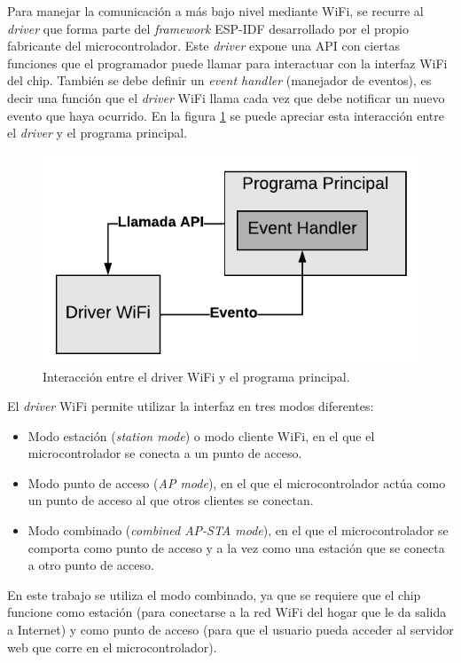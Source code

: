 Para manejar la comunicación a más bajo nivel mediante WiFi, se recurre al \emph{driver} que forma parte del \emph{framework} ESP-IDF desarrollado por el propio fabricante del microcontrolador. Este \emph{driver} expone una API con ciertas funciones que el programador puede llamar para interactuar con la interfaz WiFi del chip. También se debe definir un \emph{event handler} (manejador de eventos), es decir una función que el \emph{driver} WiFi llama cada vez que debe notificar un nuevo evento que haya ocurrido. En la figura \ref{fig:wifi_driver} se puede apreciar esta interacción entre el \emph{driver} y el programa principal.

\begin{figure}[h]
\centering
\includegraphics[scale=1.0]{./Figures/wifi_driver.pdf}
\caption{Interacción entre el driver WiFi y el programa principal.}
\label{fig:wifi_driver}
\end{figure}

El \emph{driver} WiFi permite utilizar la interfaz en tres modos diferentes:
\begin{itemize}
	\item Modo estación (\emph{station mode}) o modo cliente WiFi, en el que el microcontrolador se conecta a un punto de acceso.
	\item Modo punto de acceso (\emph{AP mode}), en el que el microcontrolador actúa como un punto de acceso al que otros clientes se conectan.
	\item Modo combinado (\emph{combined AP-STA mode}), en el que el microcontrolador se comporta como punto de acceso y a la vez como una estación que se conecta a otro punto de acceso.
\end{itemize}

En este trabajo se utiliza el modo combinado, ya que se requiere que el chip funcione como estación (para conectarse a la red WiFi del hogar que le da salida a Internet) y como punto de acceso (para que el usuario pueda acceder al servidor web que corre en el microcontrolador).

